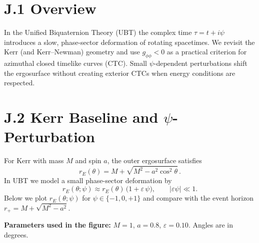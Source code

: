 
\maketitle


\SpeculativeContentWarning

\section*{J.1 Overview}
In the Unified Biquaternion Theory (UBT) the complex time $\tau=t+i\psi$ introduces a slow, phase-sector deformation of rotating spacetimes. 
We revisit the Kerr (and Kerr--Newman) geometry and use $g_{\phi\phi}<0$ as a practical criterion for azimuthal closed timelike curves (CTC).
Small $\psi$-dependent perturbations shift the ergosurface without creating exterior CTCs when energy conditions are respected.

\section*{J.2 Kerr Baseline and $\psi$-Perturbation}
For Kerr with mass $M$ and spin $a$, the outer ergosurface satisfies
\begin{equation}
r_E(\theta)=M+\sqrt{M^2-a^2\cos^2\theta}\,.
\end{equation}
In UBT we model a small phase-sector deformation by
\begin{equation}
r_E(\theta;\psi)\approx r_E(\theta)\,\bigl(1+\varepsilon\,\psi\bigr),\qquad |\varepsilon\psi|\ll 1.
\end{equation}
Below we plot $r_E(\theta;\psi)$ for $\psi\in\{-1,0,+1\}$ and compare with the event horizon $r_+=M+\sqrt{M^2-a^2}$.

\bigskip
\noindent\textbf{Parameters used in the figure:} $M=1$, $a=0.8$, $\varepsilon=0.10$. Angles are in degrees.

